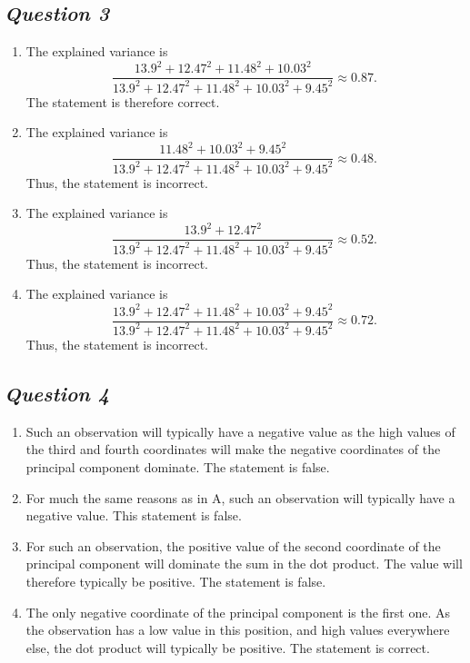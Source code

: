 \documentclass[twoside,11pt]{article}
\makeatletter
\let\@oldsubsection\subsection
\renewcommand\subsection[1]{\@oldsubsection*{\textit{#1}}}
\makeatother
\begin{document}
\subsection{Question 3}

\begin{enumerate}[label=\Alph*.]
	\item The explained variance is
	\[
		\frac{13.9^2 + 12.47^2 + 11.48^2 + 10.03^2}{13.9^2 + 12.47^2 + 11.48^2 + 10.03^2 + 9.45^2} \approx 0.87.
	\]
	The statement is therefore correct.

	\item The explained variance is
	\[
		\frac{11.48^2 + 10.03^2 + 9.45^2}{13.9^2 + 12.47^2 + 11.48^2 + 10.03^2 + 9.45^2} \approx 0.48.
	\]
	Thus, the statement is incorrect.

	\item The explained variance is
	\[
		\frac{13.9^2 + 12.47^2}{13.9^2 + 12.47^2 + 11.48^2 + 10.03^2 + 9.45^2} \approx 0.52.
	\]
	Thus, the statement is incorrect.

	\item The explained variance is
	\[
		\frac{13.9^2 + 12.47^2 + 11.48^2 + 10.03^2 + 9.45^2}{13.9^2 + 12.47^2 + 11.48^2 + 10.03^2 + 9.45^2} \approx 0.72.
	\]
	Thus, the statement is incorrect.

\end{enumerate}

\subsection{Question 4}

\begin{enumerate}[label=\Alph*.]
	\item Such an observation will typically have a negative value as the high values of the third and fourth coordinates will make the negative coordinates of the principal component dominate. The statement is false.

	\item For much the same reasons as in A, such an observation will typically have a negative value. This statement is false.

	\item For such an observation, the positive value of the second coordinate of the principal component will dominate the sum in the dot product. The value will therefore typically be positive. The statement is false.

	\item The only negative coordinate of the principal component is the first one. As the observation has a low value in this position, and high values everywhere else, the dot product will typically be positive. The statement is correct.
	\end{enumerate}
\end{document}
